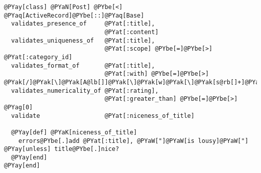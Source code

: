 \begin{Verbatim}[commandchars=@\[\]]
@PYay[class] @PYaN[Post] @PYbe[<] @PYaq[ActiveRecord]@PYbe[::]@PYaq[Base]
  validates_presence_of     @PYat[:title],
                            @PYat[:content]
  validates_uniqueness_of   @PYat[:title],
                            @PYat[:scope] @PYbe[=]@PYbe[>] @PYat[:category_id]
  validates_format_of       @PYat[:title],
                            @PYat[:with] @PYbe[=]@PYbe[>] @PYak[/]@PYak[\]@PYak[A@lb[]]@PYak[\]@PYak[w]@PYak[\]@PYak[s@rb[]+]@PYak[\]@PYak[Z]@PYak[/]
  validates_numericality_of @PYat[:rating],
                            @PYat[:greater_than] @PYbe[=]@PYbe[>] @PYag[0]
  validate                  @PYat[:niceness_of_title]

  @PYay[def] @PYaK[niceness_of_title]
    errors@PYbe[.]add @PYat[:title], @PYaW["]@PYaW[is lousy]@PYaW["] @PYay[unless] title@PYbe[.]nice?
  @PYay[end]
@PYay[end]
\end{Verbatim}
